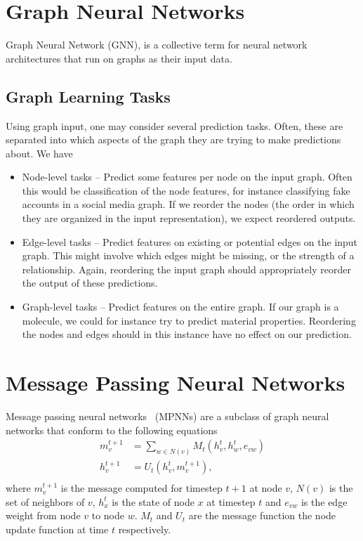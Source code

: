 \documentclass[../main.tex]{subfiles}
\begin{document}
    \section{Graph Neural Networks}\label{sec:graph-neural-networks}
    Graph Neural Network (GNN), is a collective term for neural network architectures that run on graphs as their input data.

    \subsection{Graph Learning Tasks}\label{subsec:graph-learning-tasks}
    Using graph input, one may consider several prediction tasks.
    Often, these are separated into which aspects of the graph they are trying to make predictions about.
    We have
    \begin{itemize}
        \item Node-level tasks -- Predict some features per node on the input graph.
        Often this would be classification of the node features, for instance classifying fake accounts in a social media graph.
        If we reorder the nodes (the order in which they are organized in the input representation), we expect reordered outputs.
        \item Edge-level tasks -- Predict features on existing or potential edges on the input graph.
        This might involve which edges might be missing, or the strength of a relationship.
        Again, reordering the input graph should appropriately reorder the output of these predictions.
        \item Graph-level tasks -- Predict features on the entire graph.
        If our graph is a molecule, we could for instance try to predict material properties.
        Reordering the nodes and edges should in this instance have no effect on our prediction.
    \end{itemize}

    \section{Message Passing Neural Networks}\label{sec:message-passing-neural-networks}
    Message passing neural networks~\cite{gilmerNeuralMessagePassing2017} (MPNNs) are a subclass of graph neural networks that conform to the following equations
    \begin{align}
        m^{t+1}_v &= \sum_{w \in N(v)} M_t(h^t_v, h^t_w, e_{vw})\label{eq:mpnn-message}\\
        h^{t+1}_v &= U_t(h_v^t, m_v^{t + 1}),\label{eq:mpnn-update}\\
    \end{align}
    where $m^{t+1}_v$ is the message computed for timestep $t + 1$ at node $v$, $N(v)$ is the set of neighbors of $v$, $h^t_x$ is the state of node $x$ at timestep $t$ and $e_{vw}$ is the edge weight from node $v$ to node $w$.
    $M_t$ and $U_t$ are the message function the node update function at time $t$ respectively.
\end{document}
